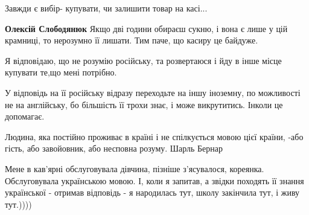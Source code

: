 \begin{itemize}
Завжди є вибір- купувати, чи залишити товар на касі...

\begin{itemize}
 
\textbf{Олексій Слободянюк} Якщо дві години обираєш сукню, і вона є лише у цій крамниці, то нерозумно її лишати. Тим паче, що касиру це байдуже.
\end{itemize}

 
Я відповідаю, що не розумію російську, та розвертаюся і йду в інше місце купувати те,що мені потрібно.

 

У відповідь на її російську відразу переходьте на іншу іноземну, по можливості
не на англійську, бо більшість її трохи знає, і може викрутитись. Інколи це
допомагає.


 

Людина, яка постійно проживає в країні і не спілкується мовою цієї країни, -або
гість, або завойовник, або несповна розуму. Шарль Бернар


 

Мене в кав'ярні обслуговувала дівчина, пізніше з'ясувалося, кореянка.
Обслуговувала українською мовою. І, коли я запитав, а звідки походять її знання
української - отримав відповідь - я народилась тут, школу закінчила тут, і живу
тут.))))


\end{itemize}
